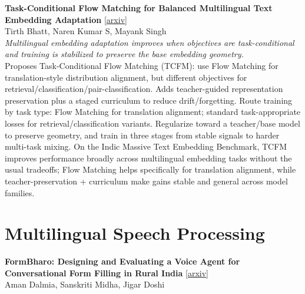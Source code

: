 \documentclass[12pt,letterpaper]{article}
\begin{document}
\medskip

{\small\textbf{Task-Conditional Flow Matching for Balanced Multilingual Text Embedding Adaptation}} {\scriptsize[\href{https://arxiv.org/abs/2608.05785}{arxiv}]}\\
{\scriptsize Tirth Bhatt, Naren Kumar S, Mayank Singh}\\

{\small\textit{Multilingual embedding adaptation improves when objectives are task-conditional and training is stabilized to preserve the base embedding geometry.}}\\[1pt]
{\footnotesize Proposes Task-Conditional Flow Matching (TCFM): use Flow Matching for translation-style distribution alignment, but different objectives for retrieval/classification/pair-classification. Adds teacher-guided representation preservation plus a staged curriculum to reduce drift/forgetting. Route training by task type: Flow Matching for translation alignment; standard task-appropriate losses for retrieval/classification variants. Regularize toward a teacher/base model to preserve geometry, and train in three stages from stable signals to harder multi-task mixing. On the Indic Massive Text Embedding Benchmark, TCFM improves performance broadly across multilingual embedding tasks without the usual tradeoffs; Flow Matching helps specifically for translation alignment, while teacher-preservation + curriculum make gains stable and general across model families.}

\medskip


\section*{Multilingual Speech Processing}

{\small\textbf{FormBharo: Designing and Evaluating a Voice Agent for Conversational Form Filling in Rural India}} {\scriptsize[\href{https://arxiv.org/abs/2608.06027}{arxiv}]}\\
{\scriptsize Aman Dalmia, Sanskriti Midha, Jigar Doshi}\\
\end{document}
